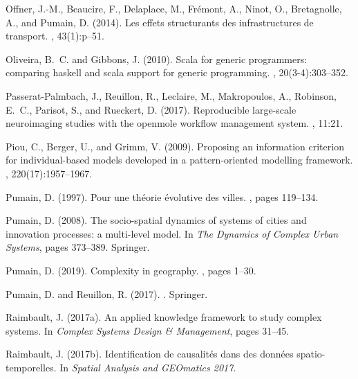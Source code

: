 \documentclass[10pt]{article}
\begin{document}
\begin{thebibliography}{}
Offner, J.-M., Beaucire, F., Delaplace, M., Fr{\'e}mont, A., Ninot, O.,
  Bretagnolle, A., and Pumain, D. (2014).
\newblock Les effets structurants des infrastructures de transport.
, 43(1):p--51.

Oliveira, B.~C. and Gibbons, J. (2010).
\newblock Scala for generic programmers: comparing haskell and scala support
  for generic programming.
, 20(3-4):303--352.

Passerat-Palmbach, J., Reuillon, R., Leclaire, M., Makropoulos, A., Robinson,
  E.~C., Parisot, S., and Rueckert, D. (2017).
\newblock Reproducible large-scale neuroimaging studies with the openmole
  workflow management system.
, 11:21.

Piou, C., Berger, U., and Grimm, V. (2009).
\newblock Proposing an information criterion for individual-based models
  developed in a pattern-oriented modelling framework.
, 220(17):1957--1967.

Pumain, D. (1997).
\newblock Pour une th{\'e}orie {\'e}volutive des villes.
, pages 119--134.

Pumain, D. (2008).
\newblock The socio-spatial dynamics of systems of cities and innovation
  processes: a multi-level model.
\newblock In {\em The Dynamics of Complex Urban Systems}, pages 373--389.
  Springer.

Pumain, D. (2019).
\newblock Complexity in geography.
, pages 1--30.

Pumain, D. and Reuillon, R. (2017).
.
\newblock Springer.

Raimbault, J. (2017a).
\newblock An applied knowledge framework to study complex systems.
\newblock In {\em Complex Systems Design \& Management}, pages 31--45.

Raimbault, J. (2017b).
\newblock Identification de causalités dans des données spatio-temporelles.
\newblock In {\em Spatial Analysis and GEOmatics 2017}.


\end{thebibliography}
\end{document}
